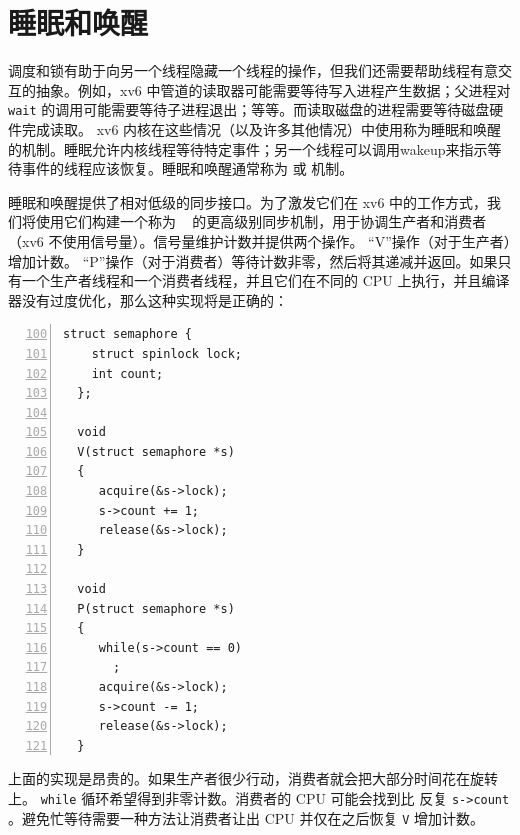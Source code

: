 \documentclass[UTF8]{article}
\begin{document}
    \section{睡眠和唤醒  }   
    \label{sec:sleep}     

调度和锁有助于向另一个线程隐藏一个线程的操作，但我们还需要帮助线程有意交互的抽象。例如，xv6 中管道的读取器可能需要等待写入进程产生数据；父进程对    \lstinline{wait}    的调用可能需要等待子进程退出；等等。而读取磁盘的进程需要等待磁盘硬件完成读取。 xv6 内核在这些情况（以及许多其他情况）中使用称为睡眠和唤醒的机制。睡眠允许内核线程等待特定事件；另一个线程可以调用wakeup来指示等待事件的线程应该恢复。睡眠和唤醒通常称为
        或
        机制。  

睡眠和唤醒提供了相对低级的同步接口。为了激发它们在 xv6 中的工作方式，我们将使用它们构建一个称为        ~    \cite{dijkstra65}    的更高级别同步机制，用于协调生产者和消费者（xv6 不使用信号量）。信号量维护计数并提供两个操作。 “V”操作（对于生产者）增加计数。 “P”操作（对于消费者）等待计数非零，然后将其递减并返回。如果只有一个生产者线程和一个消费者线程，并且它们在不同的 CPU 上执行，并且编译器没有过度优化，那么这种实现将是正确的：
    \begin{lstlisting}[numbers=left,firstnumber=100]
  struct semaphore {
    struct spinlock lock;
    int count;
  };

  void
  V(struct semaphore *s)
  {
     acquire(&s->lock);
     s->count += 1;
     release(&s->lock);
  }

  void
  P(struct semaphore *s)
  {
     while(s->count == 0)
       ;
     acquire(&s->lock);
     s->count -= 1;
     release(&s->lock);
  }
\end{lstlisting}     

上面的实现是昂贵的。如果生产者很少行动，消费者就会把大部分时间花在旋转上。
    \lstinline{while}    循环希望得到非零计数。消费者的 CPU 可能会找到比
        反复
    \lstinline{s->count}    。避免忙等待需要一种方法让消费者让出 CPU 并仅在之后恢复
    \lstinline{V}    增加计数。  
\end{document}
